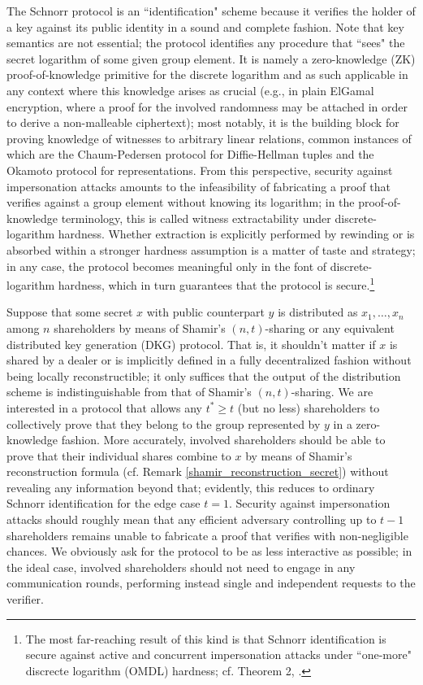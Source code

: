 \documentclass[psamsfonts, reqno]{amsart}
\theoremstyle{definition}
\theoremstyle{remark}
\numberwithin{equation}{section}
\begin{document}
The Schnorr protocol is an ``identification" scheme
because it verifies the holder of a key
against its public identity in a sound and complete fashion.
Note that key semantics are not essential;
the protocol identifies any procedure
that ``sees" the secret logarithm of some given group element.
It is namely a zero-knowledge (ZK) proof-of-knowledge primitive
for the discrete logarithm and as such applicable in any context where this knowledge arises as crucial
(e.g., in plain ElGamal encryption,
where a proof for the involved randomness
may be attached in order to derive a non-malleable ciphertext);
most notably, it is the building block
for proving knowledge of witnesses to arbitrary linear relations,
common instances of which are
the Chaum-Pedersen protocol for Diffie-Hellman tuples
and the Okamoto protocol for representations.
From this perspective,
security against impersonation attacks
amounts to the infeasibility of fabricating
a proof that verifies against a group element
without knowing its logarithm;
in the proof-of-knowledge terminology,
this is called witness extractability
under discrete-logarithm hardness.
Whether extraction is explicitly performed
by rewinding or is absorbed
within a stronger hardness assumption is a matter
of taste and strategy; in any case, the protocol
becomes meaningful only in the font of discrete-logarithm hardness,
which in turn guarantees
that the protocol is secure.\footnote{The
most far-reaching result of this kind is that
Schnorr identification is secure
against active and concurrent impersonation attacks
under ``one-more" discrecte logarithm (OMDL) hardness;
cf. Theorem 2, \cite{paper_bellare_palacio}.}

Suppose that some secret $x$
with public counterpart $y$ is distributed as $x_1, \dots, x_n$
among $n$ shareholders by means of Shamir's $(n, t)$-sharing
or any equivalent distributed key generation (DKG)
protocol. That is, it shouldn't matter if $x$ is shared by
a dealer or is implicitly defined in a fully decentralized
fashion without being locally reconstructible;
it only suffices that the output of the
distribution scheme is indistinguishable
from that of Shamir's $(n, t)$-sharing.
We are interested in a protocol that allows any
$t^* \ge t$ (but no less) shareholders to collectively prove
that they belong to the group represented by $y$
in a zero-knowledge fashion. More accurately, involved shareholders
should be able to prove that their individual shares
combine to $x$ by means of Shamir's reconstruction formula
(cf. Remark \ref{shamir_reconstruction_secret})
without revealing any information beyond that;
evidently, this reduces to ordinary Schnorr identification
for the edge case $t=1$.
Security against impersonation attacks should roughly mean that any
efficient adversary controlling up to $t-1$ shareholders
remains unable to fabricate a proof that verifies
with non-negligible chances.
We obviously ask for the protocol to be
as less interactive as possible;
in the ideal case, involved shareholders should not need to
engage in any communication rounds, performing instead single and
independent requests to the verifier.
\end{document}
